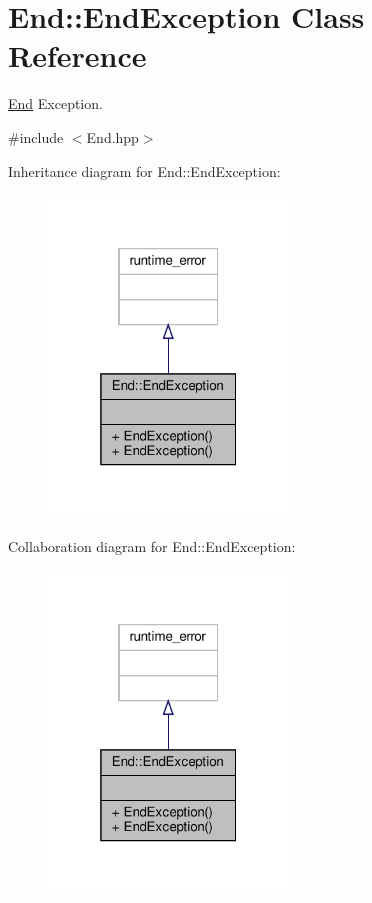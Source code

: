 \hypertarget{class_end_1_1_end_exception}{}\section{End\+:\+:End\+Exception Class Reference}
\label{class_end_1_1_end_exception}


\hyperlink{class_end}{End} Exception.  




{\ttfamily \#include $<$End.\+hpp$>$}



Inheritance diagram for End\+:\+:End\+Exception\+:
\nopagebreak
\begin{figure}[H]
\begin{center}
\leavevmode
\includegraphics[width=181pt]{class_end_1_1_end_exception__inherit__graph}
\end{center}
\end{figure}


Collaboration diagram for End\+:\+:End\+Exception\+:
\nopagebreak
\begin{figure}[H]
\begin{center}
\leavevmode
\includegraphics[width=181pt]{class_end_1_1_end_exception__coll__graph}
\end{center}
\end{figure}
